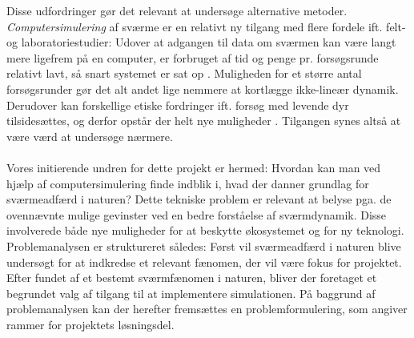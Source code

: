 Disse udfordringer gør det relevant at undersøge alternative metoder. \textit{Computersimulering} af sværme er en relativt ny tilgang med flere fordele ift. felt- og laboratoriestudier: Udover at adgangen til data om sværmen kan være langt mere ligefrem på en computer, er forbruget af tid og penge pr. forsøgsrunde relativt lavt, så snart systemet er sat op \cite{simulationintro1}\cite{simulationintro2}. Muligheden for et større antal forsøgsrunder gør det alt andet lige nemmere at kortlægge ikke-lineær dynamik. Derudover kan forskellige etiske fordringer ift. forsøg med levende dyr tilsidesættes, og derfor opstår der helt nye muligheder \cite{animalethics}. Tilgangen synes altså at være værd at undersøge nærmere.\\\\
Vores initierende undren for dette projekt er hermed: Hvordan kan man ved hjælp af computersimulering finde indblik i, hvad der danner grundlag for sværmeadfærd i naturen? Dette tekniske problem er relevant at belyse pga. de ovennævnte mulige gevinster ved en bedre forståelse af sværmdynamik. Disse involverede både nye muligheder for at beskytte økosystemet og for ny teknologi. \\
Problemanalysen er struktureret således: Først vil sværmeadfærd i naturen blive undersøgt for at indkredse et relevant fænomen, der vil være fokus for projektet.
Efter fundet af et bestemt sværmfænomen i naturen, bliver der foretaget et begrundet valg af tilgang til at implementere simulationen.  
På baggrund af problemanalysen kan der herefter fremsættes en problemformulering, som angiver rammer for projektets løsningsdel.





